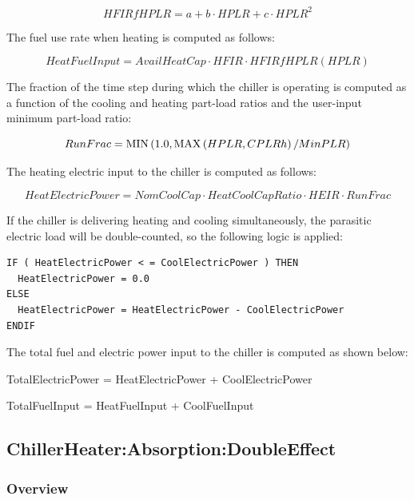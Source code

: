 \begin{equation}
HFIRfHPLR = a + b \cdot HPLR + c \cdot HPL{R^2}
\end{equation}

The fuel use rate when heating is computed as follows:

\begin{equation}
HeatFuelInput = AvailHeatCap \cdot HFIR \cdot HFIRfHPLR(HPLR)
\end{equation}

The fraction of the time step during which the chiller is operating is computed as a function of the cooling and heating part-load ratios and the user-input minimum part-load ratio:

\begin{equation}
RunFrac = {\mathop{\rm MIN}\nolimits} \left( {1.0,{\mathop{\rm MAX}\nolimits} \left( {HPLR,CPLRh} \right)/MinPLR} \right)
\end{equation}

The heating electric input to the chiller is computed as follows:

\begin{equation}
HeatElectricPower = NomCoolCap \cdot HeatCoolCapRatio \cdot HEIR \cdot RunFrac
\end{equation}

If the chiller is delivering heating and cooling simultaneously, the parasitic electric load will be double-counted, so the following logic is applied:

\begin{lstlisting}
IF ( HeatElectricPower < = CoolElectricPower ) THEN
  HeatElectricPower = 0.0
ELSE
  HeatElectricPower = HeatElectricPower - CoolElectricPower
ENDIF
\end{lstlisting}

The total fuel and electric power input to the chiller is computed as shown below:

TotalElectricPower = HeatElectricPower + CoolElectricPower

TotalFuelInput = HeatFuelInput + CoolFuelInput

\subsection{ChillerHeater:Absorption:DoubleEffect}\label{chillerheaterabsorptiondoubleeffect}

\subsubsection{Overview}\label{overview-1-003}

